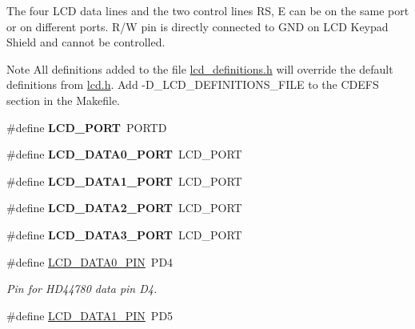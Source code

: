 The four L\+CD data lines and the two control lines RS, E can be on the same port or on different ports. R/W pin is directly connected to G\+ND on L\+CD Keypad Shield and cannot be controlled.

\begin{DoxyNote}{Note}
All definitions added to the file \hyperlink{a00003}{lcd\+\_\+definitions.\+h} will override the default definitions from \hyperlink{a00002}{lcd.\+h}. Add -\/\+D\+\_\+\+L\+C\+D\+\_\+\+D\+E\+F\+I\+N\+I\+T\+I\+O\+N\+S\+\_\+\+F\+I\+LE to the C\+D\+E\+FS section in the Makefile. 
\end{DoxyNote}
\begin{DoxyCompactItemize}
\item 
\#define {\bfseries L\+C\+D\+\_\+\+P\+O\+RT}~P\+O\+R\+TD\hypertarget{a00007_gabcf42bd88b3c36193f301ca25b033875}{}\label{a00007_gabcf42bd88b3c36193f301ca25b033875}

\item 
\#define {\bfseries L\+C\+D\+\_\+\+D\+A\+T\+A0\+\_\+\+P\+O\+RT}~L\+C\+D\+\_\+\+P\+O\+RT\hypertarget{a00007_gafc0acd4774bcd311595732f5367e266b}{}\label{a00007_gafc0acd4774bcd311595732f5367e266b}

\item 
\#define {\bfseries L\+C\+D\+\_\+\+D\+A\+T\+A1\+\_\+\+P\+O\+RT}~L\+C\+D\+\_\+\+P\+O\+RT\hypertarget{a00007_ga345af0248d5739bd8896d4f585618ca2}{}\label{a00007_ga345af0248d5739bd8896d4f585618ca2}

\item 
\#define {\bfseries L\+C\+D\+\_\+\+D\+A\+T\+A2\+\_\+\+P\+O\+RT}~L\+C\+D\+\_\+\+P\+O\+RT\hypertarget{a00007_ga4d5c48a3f2b9426c14bbca3150834a20}{}\label{a00007_ga4d5c48a3f2b9426c14bbca3150834a20}

\item 
\#define {\bfseries L\+C\+D\+\_\+\+D\+A\+T\+A3\+\_\+\+P\+O\+RT}~L\+C\+D\+\_\+\+P\+O\+RT\hypertarget{a00007_gaec71b6692f2af7c9de32dbe85fcb51c2}{}\label{a00007_gaec71b6692f2af7c9de32dbe85fcb51c2}

\item 
\#define \hyperlink{a00007_gafe54d7d886b5c56bed0cf971febbb773}{L\+C\+D\+\_\+\+D\+A\+T\+A0\+\_\+\+P\+IN}~P\+D4\hypertarget{a00007_gafe54d7d886b5c56bed0cf971febbb773}{}\label{a00007_gafe54d7d886b5c56bed0cf971febbb773}

\begin{DoxyCompactList}\small\item\em Pin for H\+D44780 data pin D4. \end{DoxyCompactList}\item 
\#define \hyperlink{a00007_ga97fb520e7b83bb047ac5c9247de57049}{L\+C\+D\+\_\+\+D\+A\+T\+A1\+\_\+\+P\+IN}~P\+D5\hypertarget{a00007_ga97fb520e7b83bb047ac5c9247de57049}{}\label{a00007_ga97fb520e7b83bb047ac5c9247de57049}


\end{DoxyCompactItemize}

